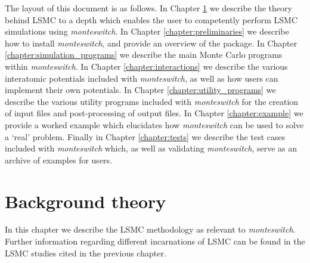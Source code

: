 \documentclass{report}
\begin{document}
The layout of this document is as follows. In Chapter \ref{chapter:background} we describe the theory behind LSMC to a depth which enables the user to 
competently perform LSMC simulations using \emph{monteswitch}.
In Chapter \ref{chapter:preliminaries} we describe how to install \emph{monteswitch}, and provide
an overview of the package. In Chapter \ref{chapter:simulation_programs} we describe the main Monte Carlo programs within
\emph{monteswitch}. In Chapter \ref{chapter:interactions} we describe the various interatomic potentials included with \emph{monteswitch}, as well as
how users can implement their own potentials. In Chapter \ref{chapter:utility_programs} we describe the various utility
programs included with \emph{monteswitch} for the creation of input files and post-processing of output files. In Chapter \ref{chapter:example}
we provide a worked example which elucidates how \emph{monteswitch} can be used to solve a `real' problem. Finally in Chapter \ref{chapter:tests}
we describe the test cases included with \emph{monteswitch} which, as well as validating \emph{monteswitch}, serve as an archive of examples
for users.




\chapter{Background theory}\label{chapter:background}
In this chapter we describe the LSMC methodology as relevant to \emph{monteswitch}. Further information regarding different incarnations of
LSMC can be found in the LSMC studies cited in the previous chapter.
\end{document}
